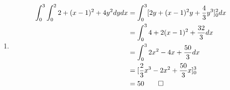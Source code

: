 \documentclass[12pt, a4paper]{article}
\begin{document}
\begin{enumerate}[Q\arabic*.]
  \item 
    \begin{align*}
      \int^3_0 \int^2_0 2 + (x-1)^2 + 4y^2 dydx &= \int^3_0 [2y+(x-1)^2y + \frac{4}{3}y^3]^2_0 dx\\
                                                &= \int^3_0 4 + 2(x-1)^2 + \frac{32}{3} dx\\
                                                &= \int^3_0 2x^2 - 4x + \frac{50}{3} dx\\
                                                &= [\frac{2}{3}x^3 -2x^2 + \frac{50}{3}x]^3_0\\
                                                &= 50\qed
    \end{align*}
\end{enumerate}
\end{document}
